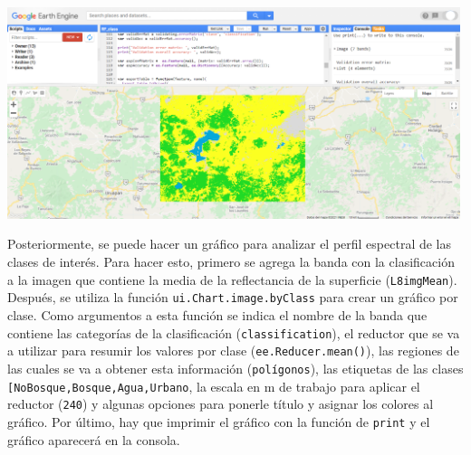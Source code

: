 \documentclass[
]{article}
\begin{document}
\includegraphics[width=500px]{Img/RFClass}

Posteriormente, se puede hacer un gráfico para analizar el perfil
espectral de las clases de interés. Para hacer esto, primero se agrega
la banda con la clasificación a la imagen que contiene la media de la
reflectancia de la superficie (\texttt{L8imgMean}). Después, se utiliza
la función \texttt{ui.Chart.image.byClass} para crear un gráfico por
clase. Como argumentos a esta función se indica el nombre de la banda
que contiene las categorías de la clasificación
(\texttt{\textquotesingle{}classification\textquotesingle{}}), el
reductor que se va a utilizar para resumir los valores por clase
(\texttt{ee.Reducer.mean()}), las regiones de las cuales se va a obtener
esta información (\texttt{polígonos}), las etiquetas de las clases
\texttt{{[}\textquotesingle{}NoBosque\textquotesingle{},\textquotesingle{}Bosque\textquotesingle{},\textquotesingle{}Agua\textquotesingle{},\textquotesingle{}Urbano\textquotesingle{}{]}},
la escala en m de trabajo para aplicar el reductor (\texttt{240}) y
algunas opciones para ponerle título y asignar los colores al gráfico.
Por último, hay que imprimir el gráfico con la función de \texttt{print}
y el gráfico aparecerá en la consola.
\end{document}
